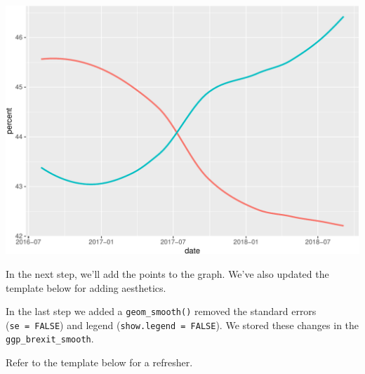 \documentclass[letterpaper,12pt,twoside,]{pinp}
\begin{document}
\begin{center}\includegraphics{03-intro-to-ggplot2_files/figure-latex/ggp_brexit_smooth-1} \end{center}

In the next step, we'll add the points to the graph. We've also updated
the template below for adding aesthetics.

\begin{Shaded}
\begin{Highlighting}[]
\SpecialCharTok{\textless{}}\SpecialCharTok{\textgreater{}} \SpecialCharTok{\%\textgreater{}\%} 
  \NormalTok{(} \NormalTok{(} \SpecialCharTok{\textless{}}\SpecialCharTok{\textgreater{}}\NormalTok{, } \SpecialCharTok{\textless{}}\SpecialCharTok{\textgreater{}}\NormalTok{)) }\SpecialCharTok{+} 
    \ErrorTok{\textless{}}\SpecialCharTok{\textgreater{}}\NormalTok{(} \NormalTok{(}\SpecialCharTok{\textless{}}\SpecialCharTok{\textgreater{}}\NormalTok{), }
                     \NormalTok{)}
\end{Highlighting}
\end{Shaded}

In the last step we added a \texttt{geom\_smooth()} removed the standard
errors (\texttt{se\ =\ FALSE}) and legend
(\texttt{show.legend\ =\ FALSE}). We stored these changes in the
\texttt{ggp\_brexit\_smooth}.

Refer to the template below for a refresher.
\end{document}
